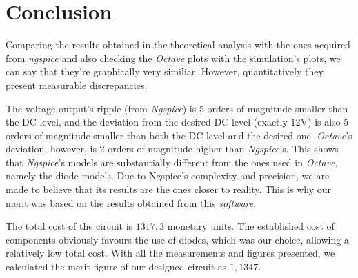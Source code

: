 \section{Conclusion}
\label{sec:conclusion}

Comparing the results obtained in the theoretical analysis  with the ones acquired from \textit{ngspice} and also checking the \textit{Octave} plots with the simulation's plots, we can say that they're graphically very similiar. However, quantitatively they present measurable discrepancies.

The voltage output's ripple (from \textit{Ngspice}) is 5 orders of magnitude smaller than the DC level, and the deviation from the desired DC level (exactly $12$V) is also 5 orders of magnitude smaller than both the DC level and the desired one.
\textit{Octave}'s deviation, however, is 2 orders of magnitude higher than \textit{Ngspice}'s. This shows that \textit{Ngspice}'s models are substantially different from the ones used in \textit{Octave}, namely the diode models. Due to Ngspice's complexity and precision, we are made to believe
 that its results are the ones closer to reality. This is why our merit was based on the results obtained from this \textit{software}.\par

The total cost of the circuit is $1317,3$ monetary units. The established cost of components obviously favours the use of diodes, which was our choice, allowing a relatively low total cost.
With all the measurements and figures presented, we calculated the merit figure of our designed circuit as $1,1347$.
